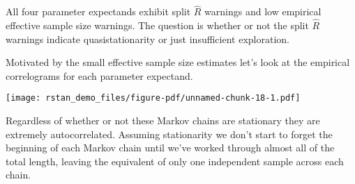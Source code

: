 \documentclass[
  letterpaper,
  DIV=11,
  numbers=noendperiod]{scrartcl}
\newenvironment{Shaded}{\begin{snugshade}}{\end{snugshade}}
\newcommand{\AttributeTok}[1]{\textcolor[rgb]{0.40,0.45,0.13}{#1}}
\newcommand{\DecValTok}[1]{\textcolor[rgb]{0.68,0.00,0.00}{#1}}
\newcommand{\FloatTok}[1]{\textcolor[rgb]{0.68,0.00,0.00}{#1}}
\newcommand{\FunctionTok}[1]{\textcolor[rgb]{0.28,0.35,0.67}{#1}}
\newcommand{\NormalTok}[1]{\textcolor[rgb]{0.00,0.23,0.31}{#1}}
\newcommand{\SpecialCharTok}[1]{\textcolor[rgb]{0.37,0.37,0.37}{#1}}
\newcommand{\StringTok}[1]{\textcolor[rgb]{0.13,0.47,0.30}{#1}}
\begin{document}
All four parameter expectands exhibit split \(\hat{R}\) warnings and low
empirical effective sample size warnings. The question is whether or not
the split \(\hat{R}\) warnings indicate quasistationarity or just
insufficient exploration.

Motivated by the small effective sample size estimates let's look at the
empirical correlograms for each parameter expectand.

\begin{Shaded}
\end{Shaded}

\texttt{[image: rstan\_demo\_files/figure-pdf/unnamed-chunk-18-1.pdf]}

Regardless of whether or not these Markov chains are stationary they are
extremely autocorrelated. Assuming stationarity we don't start to forget
the beginning of each Markov chain until we've worked through almost all
of the total length, leaving the equivalent of only one independent
sample across each chain.
\end{document}
